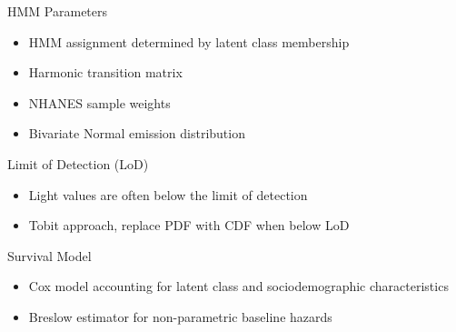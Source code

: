 \documentclass{beamer}
\begin{document}
    

\begin{frame}{HMM Parameters}
\begin{itemize}
    \item HMM assignment determined by latent class membership
    \item Harmonic transition matrix
    \item NHANES sample weights
    \item Bivariate Normal emission distribution
\end{itemize}
\end{frame}



\begin{frame}{Limit of Detection (LoD)}
\begin{itemize}
    \item Light values are often below the limit of detection
    \item Tobit approach, replace PDF with CDF when below LoD
\end{itemize}
\end{frame}

\begin{frame}{Survival Model}
\begin{itemize}
    \item Cox model accounting for latent class and sociodemographic characteristics
    \item Breslow estimator for non-parametric baseline hazards
\end{itemize}
\end{frame}
\end{document}
